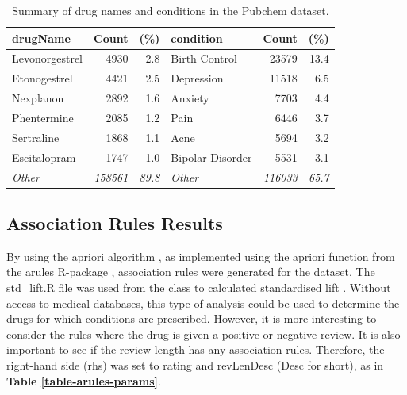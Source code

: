 \documentclass[11pt]{article}
\begin{document}
\begin{table}[H]
\centering
\begin{tabular}{lrrlrr}
\toprule
\textbf{drugName} & \multicolumn{1}{l}{\textbf{Count}} & \multicolumn{1}{l}{\textbf{(\%)}} & \textbf{condition} & \multicolumn{1}{l}{\textbf{Count}} & \multicolumn{1}{l}{\textbf{(\%)}} \\
\midrule
Levonorgestrel    & 4930                               & 2.8                               & Birth Control      & 23579                              & 13.4                              \\
Etonogestrel      & 4421                               & 2.5                               & Depression         & 11518                              & 6.5                               \\
Nexplanon         & 2892                               & 1.6                               & Anxiety            & 7703                               & 4.4                               \\
Phentermine       & 2085                               & 1.2                               & Pain               & 6446                               & 3.7                               \\
Sertraline        & 1868                               & 1.1                               & Acne               & 5694                               & 3.2                               \\
Escitalopram      & 1747                               & 1.0                               & Bipolar Disorder   & 5531                               & 3.1                               \\
\textit{Other}    & \textit{158561}                    & \textit{89.8}                     & \textit{Other}     & \textit{116033}                    &  \textit{65.7} \\
\bottomrule
\end{tabular}
\caption{Summary of drug names and conditions in the Pubchem dataset.}
\label{table-drugs-conditions}
\end{table}

\subsection{Association Rules Results}

By using the apriori algorithm \cite{apriori-paper}, as implemented using the apriori function from the arules R-package \cite{r-arules}, association rules were generated for the dataset. The std\_lift.R file was used from the class to calculated standardised lift \cite{class-notes-arules}. Without access to medical databases, this type of analysis could be used to determine the drugs for which conditions are prescribed. However, it is more interesting to consider the rules where the drug is given a positive or negative review. It is also important to see if the review length has any association rules. Therefore, the right-hand side (rhs) was set to rating and revLenDesc (Desc for short), as in \textbf{Table \ref{table-arules-params}}.
\end{document}
